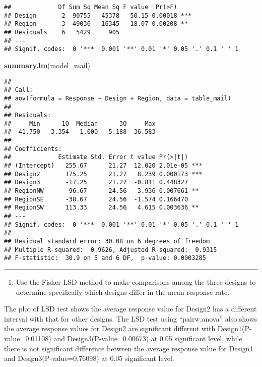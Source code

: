 \documentclass[]{article}
\newenvironment{Shaded}{\begin{snugshade}}{\end{snugshade}}
\newcommand{\KeywordTok}[1]{\textcolor[rgb]{0.13,0.29,0.53}{\textbf{#1}}}
\newcommand{\NormalTok}[1]{#1}
\providecommand{\tightlist}{%
  \setlength{\itemsep}{0pt}\setlength{\parskip}{0pt}}
\begin{document}
\begin{verbatim}
##             Df Sum Sq Mean Sq F value  Pr(>F)    
## Design       2  90755   45378   50.15 0.00018 ***
## Region       3  49036   16345   18.07 0.00208 ** 
## Residuals    6   5429     905                    
## ---
## Signif. codes:  0 '***' 0.001 '**' 0.01 '*' 0.05 '.' 0.1 ' ' 1
\end{verbatim}

\begin{Shaded}
\begin{Highlighting}[]
\KeywordTok{summary.lm}\NormalTok{(model_mail)}
\end{Highlighting}
\end{Shaded}

\begin{verbatim}
## 
## Call:
## aov(formula = Response ~ Design + Region, data = table_mail)
## 
## Residuals:
##     Min      1Q  Median      3Q     Max 
## -41.750  -3.354  -1.000   5.188  36.583 
## 
## Coefficients:
##             Estimate Std. Error t value Pr(>|t|)    
## (Intercept)   255.67      21.27  12.020 2.01e-05 ***
## Design2       175.25      21.27   8.239 0.000173 ***
## Design3       -17.25      21.27  -0.811 0.448327    
## RegionNW       96.67      24.56   3.936 0.007661 ** 
## RegionSE      -38.67      24.56  -1.574 0.166470    
## RegionSW      113.33      24.56   4.615 0.003636 ** 
## ---
## Signif. codes:  0 '***' 0.001 '**' 0.01 '*' 0.05 '.' 0.1 ' ' 1
## 
## Residual standard error: 30.08 on 6 degrees of freedom
## Multiple R-squared:  0.9626, Adjusted R-squared:  0.9315 
## F-statistic:  30.9 on 5 and 6 DF,  p-value: 0.0003285
\end{verbatim}

\begin{center}\rule{0.5\linewidth}{\linethickness}\end{center}

\begin{enumerate}
\def\labelenumi{(\alph{enumi})}
\setcounter{enumi}{1}
\tightlist
\item
  Use the Fisher LSD method to make comparisons among the three designs
  to determine specifically which designs differ in the mean response
  rate.
\end{enumerate}

The plot of LSD test shows the average response value for Design2 has a
different interval with that for other designs. The LSD test using
``pairw.anova'' also shows the average response values for Design2 are
significant different with Design1(P-value=0.01108) and
Design3(P-value=0.00673) at 0.05 significant level, while there is not
significant difference between the average response value for Design1
and Design3(P-value=0.76098) at 0.05 significant level.
\end{document}
